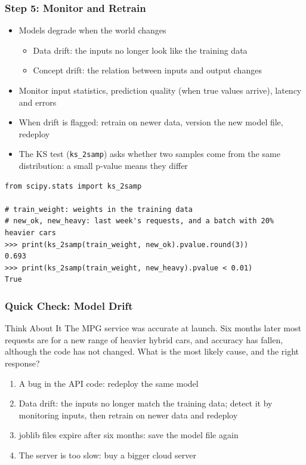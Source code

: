 \begin{frame}[fragile]\frametitle{Step 5: Monitor and Retrain}
\begin{itemize}
\item Models degrade when the world changes
\begin{itemize}
\item Data drift: the inputs no longer look like the training data
\item Concept drift: the relation between inputs and output changes
\end{itemize}
\item Monitor input statistics, prediction quality (when true values arrive), latency and errors
\item When drift is flagged: retrain on newer data, version the new model file, redeploy
\item The KS test (\texttt{ks\_2samp}) asks whether two samples come from the same distribution: a small p-value means they differ
\end{itemize}
\begin{lstlisting}
from scipy.stats import ks_2samp

# train_weight: weights in the training data
# new_ok, new_heavy: last week's requests, and a batch with 20% heavier cars
>>> print(ks_2samp(train_weight, new_ok).pvalue.round(3))
0.693
>>> print(ks_2samp(train_weight, new_heavy).pvalue < 0.01)
True
\end{lstlisting}
\end{frame}

\begin{frame}[fragile]\frametitle{Quick Check: Model Drift}
\begin{block}{Think About It}
The MPG service was accurate at launch. Six months later most requests are for a new range of heavier hybrid cars, and accuracy has fallen, although the code has not changed. What is the most likely cause, and the right response?
\begin{enumerate}
  \item[A.] A bug in the API code: redeploy the same model
  \item[B.] Data drift: the inputs no longer match the training data; detect it by monitoring inputs, then retrain on newer data and redeploy
  \item[C.] joblib files expire after six months: save the model file again
  \item[D.] The server is too slow: buy a bigger cloud server
\end{enumerate}
\end{block}
\end{frame}

